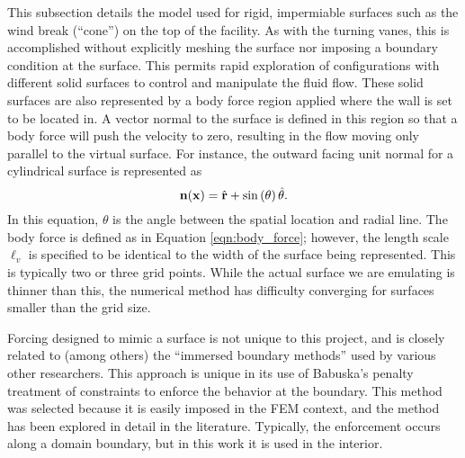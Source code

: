 This subsection details the model used for rigid, impermiable surfaces
such as the wind break (``cone'') on the top of the facility. As with
the turning vanes, this is accomplished without explicitly meshing the
surface nor imposing  a boundary condition at the surface. This permits
rapid exploration of configurations  with different solid surfaces to
control and manipulate the fluid flow. These solid surfaces are also
represented by a body force region applied where the wall is set to be
located in.  A vector normal to the surface is defined in this region so
that a body force will push  the velocity to zero, resulting in the flow
moving only parallel to the virtual surface. For instance, the outward
facing unit normal for a cylindrical surface is represented as 
\begin{equation}
 {\bf n}({\bf x}) = \hat{{\bf r}}+ \sin \left(\theta\right) \hat{{\bf \theta}}.
\end{equation}
In this equation, $\theta$ is the angle between the spatial location and
radial line. The body force is defined as in Equation
\ref{eqn:body_force}; however, the length scale $\ell_v$ is specified to
be identical to the width  of the surface being represented. This is
typically two or three grid points. While the actual surface we are
emulating is thinner than this, the numerical method has difficulty
converging for surfaces smaller than the grid size.  

Forcing designed to mimic a surface
is not unique to this project, and is closely related to (among others)
the ``immersed boundary methods'' used by various other
researchers\cite{doi:10.1146/annurev.fluid.37.061903.175743}. 
This approach is unique in its use of Babuska's penalty treatment of
constraints\cite{1973fempen,ZAMM:ZAMM19880680925} to enforce the
behavior at the boundary. This method was selected because it is easily
imposed in the FEM context, and the method has been explored in detail
in the literature. Typically, the enforcement occurs along a domain
boundary, but in this work it is used in the interior. 


